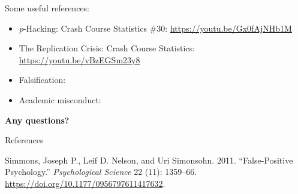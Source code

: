 \documentclass[
  ignorenonframetext,
  aspectratio=169,
]{beamer}
\providecommand{\tightlist}{%
  \setlength{\itemsep}{0pt}\setlength{\parskip}{0pt}}\usepackage{longtable,booktabs,array}
\newlength{\cslhangindent}
\newenvironment{CSLReferences}[2] %
 {\begin{list}{}{%
  \setlength{\itemindent}{0pt}
  \setlength{\leftmargin}{0pt}
  \setlength{\parsep}{0pt}
  \ifodd #1
   \setlength{\leftmargin}{\cslhangindent}
   \setlength{\itemindent}{-1\cslhangindent}
  \fi
  \setlength{\itemsep}{#2\baselineskip}}}
 {\end{list}}
\begin{document}
\begin{frame}{Some useful references:}
\label{some-useful-references}
\begin{itemize}
\tightlist
\item
  \emph{p}-Hacking: Crash Course Statistics \#30:
  \url{https://youtu.be/Gx0fAjNHb1M}
\item
  The Replication Crisis: Crash Course Statistics:
  \url{https://youtu.be/vBzEGSm23y8}
\item
  Falsification:
\item
  Academic misconduct:
\end{itemize}
\end{frame}

\begin{frame}{}
\label{section-4}
\textbf{Any questions?}
\end{frame}

\begin{frame}{References}
\label{references}
\label{refs}
\begin{CSLReferences}{1}{0}
Simmons, Joseph P., Leif D. Nelson, and Uri Simonsohn. 2011.
{``False-Positive Psychology.''} \emph{Psychological Science} 22 (11):
1359--66. \url{https://doi.org/10.1177/0956797611417632}.

\end{CSLReferences}
\end{frame}
\end{document}
